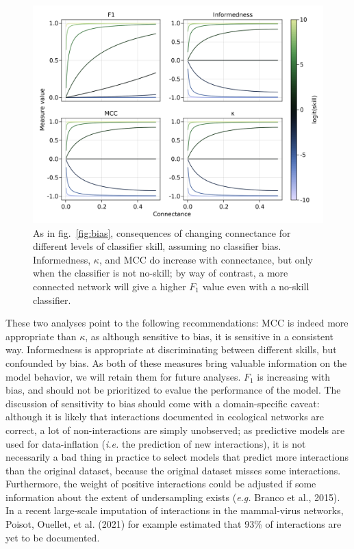 \documentclass[10pt,oneside]{article}
\makeatletter
\def\maxwidth{\ifdim\Gin@nat@width>\linewidth\linewidth
\else\Gin@nat@width\fi}
\let\Oldincludegraphics\includegraphics
\renewcommand{\includegraphics}[1]{\Oldincludegraphics[width=\maxwidth]{#1}}
\makeatother
\begin{document}
\begin{figure}
\hypertarget{fig:connectance}{%
\centering
\includegraphics{figures/changing-connectance.png}
\caption{As in fig.~\ref{fig:bias}, consequences of changing connectance
for different levels of classifier skill, assuming no classifier bias.
Informedness, \(\kappa\), and MCC do increase with connectance, but only
when the classifier is not no-skill; by way of contrast, a more
connected network will give a higher \(F_1\) value even with a no-skill
classifier.}\label{fig:connectance}
}
\end{figure}

These two analyses point to the following recommendations: MCC is indeed
more appropriate than \(\kappa\), as although sensitive to bias, it is
sensitive in a consistent way. Informedness is appropriate at
discriminating between different skills, but confounded by bias. As both
of these measures bring valuable information on the model behavior, we
will retain them for future analyses. \(F_1\) is increasing with bias,
and should not be prioritized to evalue the performance of the model.
The discussion of sensitivity to bias should come with a domain-specific
caveat: although it is likely that interactions documented in ecological
networks are correct, a lot of non-interactions are simply unobserved;
as predictive models are used for data-inflation (\emph{i.e.} the
prediction of new interactions), it is not necessarily a bad thing in
practice to select models that predict more interactions than the
original dataset, because the original dataset misses some interactions.
Furthermore, the weight of positive interactions could be adjusted if
some information about the extent of undersampling exists (\emph{e.g.}
Branco et al., 2015). In a recent large-scale imputation of interactions
in the mammal-virus networks, Poisot, Ouellet, et al. (2021) for example
estimated that 93\% of interactions are yet to be documented.
\end{document}
